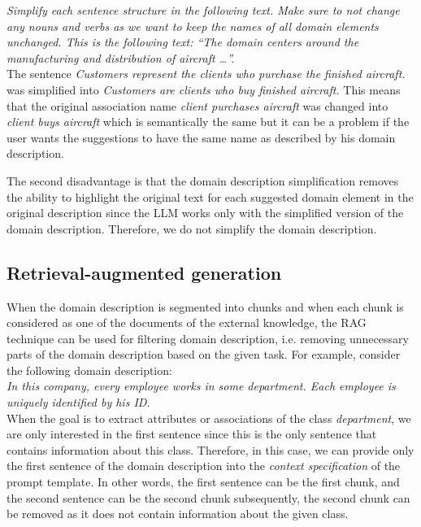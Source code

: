 \noindent{}\textit{Simplify each sentence structure in the following text. Make sure to not change any nouns and verbs as we want to keep the names of all domain elements unchanged. This is the following text: ``The domain centers around the manufacturing and distribution of aircraft \ldots''.} \\

\noindent{}The sentence \textit{Customers represent the clients who purchase the finished aircraft.} was simplified into \textit{Customers are clients who buy finished aircraft.} This means that the original association name \textit{client purchases aircraft} was changed into \textit{client buys aircraft} which is semantically the same but it can be a problem if the user wants the suggestions to have the same name as described by his domain description.

The second disadvantage is that the domain description simplification removes the ability to highlight the original text for each suggested domain element in the original description since the LLM works only with the simplified version of the domain description. Therefore, we do not simplify the domain description.


\subsection{Retrieval-augmented generation}


When the domain description is segmented into chunks and when each chunk is considered as one of the documents of the external knowledge, the RAG technique can be used for filtering domain description, i.e. removing unnecessary parts of the domain description based on the given task. For example, consider the following domain description: \\

\noindent{}\textit{In this company, every employee works in some department. Each employee is uniquely identified by his ID.}\\

\noindent{}When the goal is to extract attributes or associations of the class \textit{department}, we are only interested in the first sentence since this is the only sentence that contains information about this class. Therefore, in this case, we can provide only the first sentence of the domain description into the \emph{context specification} of the prompt template. In other words, the first sentence can be the first chunk, and the second sentence can be the second chunk subsequently, the second chunk can be removed as it does not contain information about the given class.



